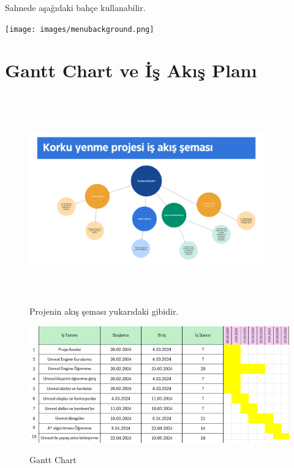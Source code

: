 \documentclass[12pt,a4paper]{article}
\begin{document}
\begin{itemize}
		     \begin{flushleft}
		 		Sahnede  aşağıdaki  bahçe kullanabilir.
		     \end{flushleft}
		     \begin{center}
				\texttt{[image: images/menubackground.png]}\cite{kopek}\cite{bahce}\newline
		   	\end{center}
			 
	     \end{itemize}
	
\section{Gantt Chart ve İş Akış Planı \newline} 
\begin{figure}[h] 

	\centering
	\includegraphics[width=0.9\textwidth ,height= 90mm ]{images/isakisi.png}\newline
	Projenin akış şeması yukarıdaki gibidir.
\end{figure}

\begin{figure}[!htbp]

	\caption{Gantt Chart}
	\centering
	\includegraphics[height= 5 cm]{ganttchart2.png}\newline
	\label{gantt}		
\end{figure}    
	\newpage
\end{document}
